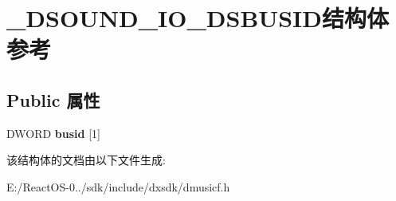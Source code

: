 \hypertarget{struct___d_s_o_u_n_d___i_o___d_s_b_u_s_i_d}{}\section{\+\_\+\+D\+S\+O\+U\+N\+D\+\_\+\+I\+O\+\_\+\+D\+S\+B\+U\+S\+I\+D结构体 参考}
\label{struct___d_s_o_u_n_d___i_o___d_s_b_u_s_i_d}
\subsection*{Public 属性}
\begin{DoxyCompactItemize}
\item 
\mbox{\label{struct___d_s_o_u_n_d___i_o___d_s_b_u_s_i_d_adfefd006b022dbadbea4880455689d07}} 
D\+W\+O\+RD {\bfseries busid} \mbox{[}1\mbox{]}
\end{DoxyCompactItemize}


该结构体的文档由以下文件生成\+:\begin{DoxyCompactItemize}
\item 
E\+:/\+React\+O\+S-\/0../sdk/include/dxsdk/dmusicf.\+h\end{DoxyCompactItemize}
